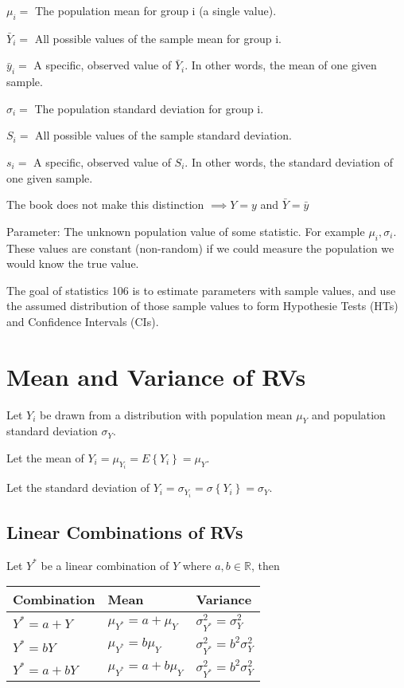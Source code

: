 \documentclass[10pt]{article}
\newcommand{\define}[1]{\colorbox{Thistle2}{#1}}
\newcommand{\emphas}[1]{\colorbox{DarkSeaGreen2}{#1}}
\newcommand{\mean}[1]{\mu_{#1}}
\renewcommand{\exp}[1]{E\left\{#1\right\}} %
\newcommand{\dev}[1]{\sigma\left\{#1\right\}}
\newcommand{\subvar}[1]{\sigma^2_{#1}} %
\newcommand{\subdev}[1]{\sigma_{#1}}
\begin{document}
\begin{multicols}{3}
    $\mu_i=$ The population mean for group i (a single value).

    $\bar Y_i =$ All possible values of the sample mean for group i.

    $\bar y_i =$ A specific, observed value of $\bar Y_i$. In other words, the mean of one given sample.

    $\sigma_i =$ The population standard deviation for group i.

    $S_i=$ All possible values of the sample standard deviation.

    $s_i=$ A specific, observed value of $S_i$. In other words, the standard deviation of one given sample.

    The book does not make this distinction $\implies Y=y$ and $\bar Y = \bar y$

    \define{Parameter}: The unknown population value of some statistic. For example $\mu_i, \sigma_i$. These values are constant (non-random) if we could measure the population we would know the true value.

    The goal of statistics 106 is to estimate parameters with sample values, and use the assumed distribution of those sample values to form \emphas{Hypothesie Tests (HTs)} and \emphas{Confidence Intervals (CIs)}.

    \section{Mean and Variance of RVs}

    Let $Y_i$ be drawn from a distribution with population mean $\mu_Y$ and population standard deviation $\sigma_Y$.

    Let the \define{mean} of $Y_i = \mean{Y_i} = \exp{Y_i} = \mean{Y}$.

    Let the \define{standard deviation} of $Y_i = \subdev{Y_i} = \dev{Y_i} = \subdev{Y}$.

    \subsection{Linear Combinations of RVs}

    Let $Y^*$ be a linear combination of $Y$ where $a,b \in \mathbb{R}$, then

    \begin{center}
        \begin{tabular}{l | l | l}
            Combination    & Mean                         & Variance                        \\ \hline
            $Y^* = a + Y$  & $\mean{Y^*} = a + \mean{Y}$  & $\subvar{Y^*} = \subvar{Y}$     \\
            $Y^* = bY$     & $\mean{Y^*} = b\mean{Y}$     & $\subvar{Y^*} = b^2 \subvar{Y}$ \\
            $Y^* = a + bY$ & $\mean{Y^*} = a + b\mean{Y}$ & $\subvar{Y^*} = b^2 \subvar{Y}$
        \end{tabular}
    \end{center}


\end{multicols}
\end{document}
